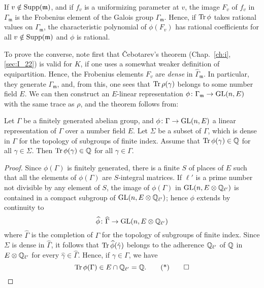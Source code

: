 If $v \notin \operatorname{Supp}(\mathfrak{m})$, and if $f_v$ is a uniformizing parameter at
$v$, the image $F_v$ of $f_v$ in $\Gamma_{\mathfrak{m}}$ is the Frobenius
element of the Galois group $\widehat{\Gamma}_{\mathfrak{m}}$. Hence, if
$\operatorname{Tr}\phi$ takes rational values on $\Gamma_{\mathfrak{m}}$, the
characteristic polynomial of $\phi(F_v)$ has rational coefficients for all
$v \notin \operatorname{Supp}(\mathfrak{m})$ and $\phi$ is rational.

To prove the converse, note first that \v Cebotarev's theorem
(Chap.~\ref{ch:i}, \ref{sec:I_22}) is valid for $K$, if one uses a somewhat
weaker definition of equipartition. Hence, the Frobenius elements $F_v$ are
\emph{dense} in $\widehat{\Gamma}_{\mathfrak{m}}$. In particular, they generate
$\Gamma_{\mathfrak{m}}$, and, from this, one sees that $\operatorname{Tr}\rho(\gamma)$
belongs to some number field $E$. We can then construct an $E$-linear
representation $\phi\colon \Gamma_{\mathfrak{m}} \to \operatorname{GL}(n, E)$ with the same
trace as $\rho$, and the theorem follows from:

\begin{lem}
	Let $\Gamma$ be a finitely generated abelian group, and $\phi\colon
	\Gamma \to \operatorname{GL}(n, E)$ a linear representation of $\Gamma$ over a number
	field $E$. Let $\Sigma$ be a subset of $\Gamma$, which is dense in
	$\Gamma$ for the topology of subgroups of finite index. Assume that
	$\operatorname{Tr}\phi(\gamma) \in \mathbb{Q}$ for all $\gamma \in \Sigma$. Then
	$\operatorname{Tr}\phi(\gamma) \in \mathbb{Q}$ for all $\gamma \in \Gamma$.
\end{lem}
\begin{proof}
	Since $\phi(\Gamma)$ is finitely generated, there is a finite $S$ of
	places of $E$ such that all the elements of $\phi(\Gamma)$ are
	$S$-integral matrices. If $\ell'$ is a prime number not divisible by
	any element of $S$, the image of $\phi(\Gamma)$ in $\operatorname{GL}(n, E \otimes
	\mathbb{Q}_{\ell'})$ is contained in a compact subgroup of $\operatorname{GL}(n, E \otimes
	\mathbb{Q}_{\ell'})$; hence $\phi$ extends by continuity to
	\dpage
	\[
		\widehat{\phi} \colon \widehat{\Gamma} \to \operatorname{GL}(n, E \otimes
		\mathbb{Q}_{\ell'})
	\]
	where $\widehat{\Gamma}$ is the completion of $\Gamma$ for the topology
	of subgroups of finite index. Since $\Sigma$ is dense in
	$\widehat{\Gamma}$, it follows that $\operatorname{Tr}\widehat{\phi}(\hat\gamma)$
	belongs to the adherence $\mathbb{Q}_{\ell'}$ of $\mathbb{Q}$ in $E \otimes \mathbb{Q}_{\ell'}$
	for every $\hat\gamma \in \widehat{\Gamma}$.  Hence, if $\gamma \in
	\Gamma$, we have
	\begin{equation}
		\Tr \phi(\Gamma) \in E \cap \Q_{\ell'} = \Q.
		\tqedhere
	\end{equation}
\end{proof}

